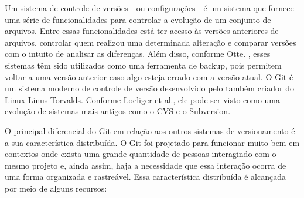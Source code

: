 Um sistema de controle de versões - ou configurações - é um sistema que fornece uma série de funcionalidades para controlar a evolução de um conjunto de arquivos. Entre essas funcionalidades está ter acesso às versões anteriores de arquivos, controlar quem realizou uma determinada alteração e comparar versões com o intuito de analisar as diferenças.  Além disso, conforme Otte. \cite{otte2009version}, esses sistemas têm sido utilizados como uma ferramenta de backup, pois  permitem voltar a uma versão anterior caso algo esteja errado com a versão atual. O Git é um sistema moderno de controle de versão desenvolvido pelo também criador do Linux Linus Torvalds. Conforme Loeliger et al.\cite{loeliger2012version}, ele pode ser visto como uma evolução de sistemas mais antigos como o CVS\cite{vesperman2006essential} e o Subversion\cite{pilato2008version}. 

O principal diferencial do Git em relação aos outros sistemas de versionamento é a sua característica distribuída. O Git foi projetado para funcionar muito bem em contextos onde exista uma grande quantidade de pessoas interagindo com o mesmo projeto e, ainda assim, haja a necessidade que essa interação ocorra de uma forma organizada e rastreável. Essa característica distribuída é alcançada por meio de alguns recursos:

